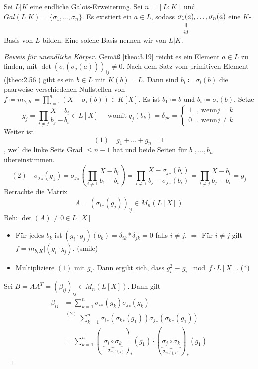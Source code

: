 \documentclass[../main.tex]{subfiles}
\begin{document}
\begin{theorem}
    Sei $L|K$ eine endliche Galois-Erweiterung. Sei $n = [L:K]$ und $Gal(L|K) = \{\sigma_1,\dots,\sigma_n\}$.
    Es existiert ein $a\in L$, sodass $\equalto{\sigma_1(a)}{id},\dots,\sigma_n(a)$ eine $K$-Basis von $L$ bilden.
    Eine solche Basis nennen wir  von $L|K$.
\end{theorem}
\begin{proof} [Beweis für unendliche Körper]
    Gemäß \ref{theo:3.19} reicht es ein Element $a\in L$ zu finden, mit $\det(\sigma_i(\sigma_j(a)))_{ij}\neq 0$.
    Nach dem Satz vom primitiven Element (\ref{theo:2.56}) gibt es ein $b\in L$ mit $K(b)=L$.
    Dann sind $b_i\coloneqq\sigma_i(b)$ die paarweise verschiedenen Nullstellen von $f\coloneqq m_{b,K}=\prod_{i=1}^n (X-\sigma_i(b))\in K[X]$.
    Es ist $b_1\coloneqq b$ und $b_i \coloneqq \sigma_i(b)$.
    Setze $$g_j = \prod_{i\neq j}\frac{X-b_i}{b_j-b_i}\in L[X]\quad\text{ womit }g_j(b_k) = \delta_{jk} = \begin{cases}
        1 & \text{, wenn} j=k\\
        0 & \text{, wenn} j\neq k
    \end{cases}$$
    Weiter ist 
    $$(1)\quad g_1+\dots+g_n=1$$, weil die linke Seite Grad $\leq n-1$ hat und beide Seiten für $b_1,\dots,b_n$ übereinstimmen.
    $$(2)\quad {\sigma_{j}}_*(g_1) = {\sigma_{j}}_*\left(\prod_{i\neq 1}\frac{X-b_i}{b_1-b_i}\right) = \prod_{i\neq 1}\frac{X-{\sigma_{j}}_*(b_i)}{b_j-{\sigma_{j}}_*(b_i)}=\prod_{i\neq j}\frac{X-b_i}{b_j-b_i} = g_j$$
    Betrachte die Matrix $$A=({\sigma_{i}}_*(g_j))_{ij} \in M_n(L[X])$$
    Beh: $\det(A) \neq 0\in L[X]$
    \begin{itemize}
        \item Für jedes $b_k$ ist $(g_i\cdot g_j)(b_k) = \delta_{ik}*\delta_{jk} = 0$ falls $i\neq j$.
        $\Rightarrow$ Für $i\neq j$ gilt $f= m_{b,K}|(g_i\cdot g_j)$. (smile)
        \item Multipliziere $(1)$ mit $g_i$. Dann ergibt sich, dass $g_i^2 \equiv g_i \mod f\cdot L[X]$. (*)
    \end{itemize}
    Sei $B=AA^T = (\beta_{ij})_{ij} \in M_n(L[X])$.
    Dann gilt 
    \begin{align*}
        \beta_{ij} &= \sum_{k=1}^n{\sigma_{i}}_*(g_k){\sigma_{j}}_* (g_k)\\
        &\overset{(2)}{=} \sum_{k=1}^n{\sigma_{i}}_*({\sigma_k}_*(g_1)){\sigma_{j}}_* ({\sigma_k}_*(g_1))\\
        &= \sum_{k=1}^n (\underbrace{\sigma_i\circ \sigma_k}_{= \sigma_{m(i,k)}})_* (g_1) \cdot (\underbrace{\sigma_j\circ\sigma_k}_{\sigma_{m(j,k)}})_* (g_1)

\end{align*}
\end{proof}
\end{document}
